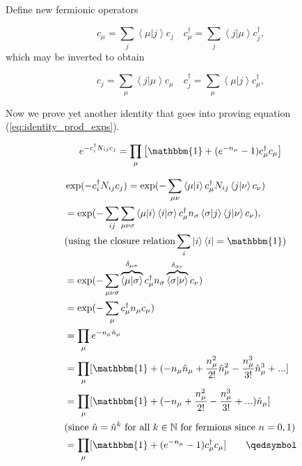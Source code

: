 Define new fermionic operators

\begin{equation}\label{eq:changeBasis1}
c_\mu = \sum_j \left\langle \mu | j \right\rangle c_j \quad
c_\mu^\dagger = \sum_j \left\langle j | \mu \right\rangle c_j^\dagger ,
\end{equation}
which may be inverted to obtain

\begin{equation}\label{eq:changeBasis2}
c_j = \sum_\mu \left\langle j | \mu \right\rangle c_\mu \quad
c_j^\dagger = \sum_\mu \left\langle \mu | j \right\rangle c_\mu^\dagger ,
\end{equation}

Now we prove yet another identity that goes into proving equation (\ref{eq:identity_prod_exps}).

\begin{equation}\label{eq:LHS_identity}
e^{-c_i^\dagger N_{ij} c_j} = \prod_\mu \big[ \mathbbm{1} + ( e^{-n_\mu} - 1 ) c_\mu^\dagger c_\mu \big]
\end{equation}

\begin{equation*}
\begin{split}
&\exp({-c_i^\dagger N_{ij} c_j}) = \exp({ - \sum_{\mu\nu} \left\langle \mu | i \right\rangle c_\mu^\dagger N_{ij} \left\langle j | \nu \right\rangle c_\nu }) \\
&= \exp({-\sum_{ij}\sum_{ \mu\nu\sigma} \left\langle \mu | i \right\rangle  \left\langle i | \sigma \right\rangle c_\mu^\dagger n_\sigma \left\langle \sigma | j \right\rangle \left\langle j | \nu \right\rangle c_\nu }) , \\
& \text{(using the closure relation} \sum_i \left| i \right\rangle \left\langle i \right|= \mathbbm{1} \text{)} \\
&= \exp({-\sum_{ \mu\nu\sigma} \overbrace{\left\langle \mu | \sigma \right\rangle}^{\delta_{\mu\sigma}}  c_\mu^\dagger n_\sigma \overbrace{\left\langle \sigma | \nu \right\rangle}^{\delta_{\sigma\nu}} c_\nu }) \\
&= \exp({-\sum_\mu c_\mu^\dagger n_\mu c_\mu}) \\
&= \prod_\mu e^{-n_\mu \hat{n}_\mu} \\
&= \prod_\mu [ \mathbbm{1} + ( - n_\mu \hat{n}_\mu + \frac{n_\mu^2}{2!} \hat{n}_\mu^2 - \frac{n_\mu^3}{3!} \hat{n}_\mu^3 + ... ] \\
&= \prod_\mu [ \mathbbm{1} + ( - n_\mu + \frac{n_\mu^2}{2!} - \frac{n_\mu^3}{3!} + ... ) \hat{n}_\mu ] \\
& \text{(since  } \hat{n} = \hat{n}^k \text{  for all  } k \in \mathbb{N} \text{  for fermions since  } n = 0, 1 ) \\
&= \prod_\mu [ \mathbbm{1} + ( e^{-n_\mu} - 1 ) c_\mu^\dagger c_\mu ] \quad\quad \qedsymbol
\end{split}
\end{equation*}

